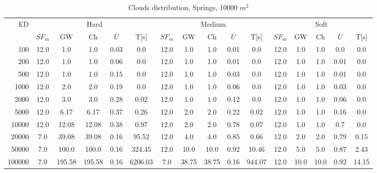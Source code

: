 \begin{table}[htb]
	\centering
	\footnotesize
	\begin{tabular}{|r|c|c|c|c|c|c|c|c|c|c|c|c|c|c|c|} 
		\hline
		\multirow{2}{*}{ED} & \multicolumn{5}{c|}{Hard} & \multicolumn{5}{c|}{Medium} &\multicolumn{5}{c|}{Soft} \\ 
		\cline{2-16} 
		&$SF_{m}$&GW & Ch & $\overline{U}$&T[s] &$SF_{m}$&GW & Ch & $\overline{U}$ &T[s] &$SF_{m}$&GW & Ch & $\overline{U}$  & T[s]  \\ 
		\hline 
		100 & 12.0 & 1.0 & 1.0 & 0.03 & 0.0 & 12.0 & 1.0 & 1.0 & 0.01 & 0.0 & 12.0 & 1.0 & 1.0 & 0.0 & 0.0\\ 
		200 & 12.0 & 1.0 & 1.0 & 0.06 & 0.0 & 12.0 & 1.0 & 1.0 & 0.01 & 0.0 & 12.0 & 1.0 & 1.0 & 0.01 & 0.0\\ 
		500 & 12.0 & 1.0 & 1.0 & 0.15 & 0.0 & 12.0 & 1.0 & 1.0 & 0.03 & 0.0 & 12.0 & 1.0 & 1.0 & 0.01 & 0.0\\ 
		1000 & 12.0 & 2.0 & 2.0 & 0.19 & 0.0 & 12.0 & 1.0 & 1.0 & 0.06 & 0.0 & 12.0 & 1.0 & 1.0 & 0.03 & 0.0\\ 
		2000 & 12.0 & 3.0 & 3.0 & 0.28 & 0.02 & 12.0 & 1.0 & 1.0 & 0.12 & 0.0 & 12.0 & 1.0 & 1.0 & 0.06 & 0.0\\ 
		5000 & 12.0 & 6.17 & 6.17 & 0.37 & 0.26 & 12.0 & 2.0 & 2.0 & 0.22 & 0.02 & 12.0 & 1.0 & 1.0 & 0.16 & 0.0\\ 
		10000 & 12.0 & 12.08 & 12.08 & 0.38 & 0.97 & 12.0 & 2.0 & 2.0 & 0.78 & 0.07 & 12.0 & 1.0 & 1.0 & 0.7 & 0.0\\ 
		20000 & 7.0 & 39.08 & 39.08 & 0.16 & 95.52 & 12.0 & 4.0 & 4.0 & 0.85 & 0.66 & 12.0 & 2.0 & 2.0 & 0.79 & 0.15\\ 
		50000 & 7.0 & 100.0 & 100.0 & 0.16 & 324.45 & 12.0 & 10.0 & 10.0 & 0.92 & 10.46 & 12.0 & 5.0 & 5.0 & 0.87 & 2.43\\ 
		100000 & 7.0 & 195.58 & 195.58 & 0.16 & 6206.03 & 7.0 & 38.75 & 38.75 & 0.16 & 944.07 & 12.0 & 10.0 & 10.0 & 0.92 & 14.15\\ 
		\hline 
	\end{tabular} 
	\caption{Clouds distribution, Springs, 10000 $m^2$} 
	\label{tab:UnSprings100} 
\end{table} 
